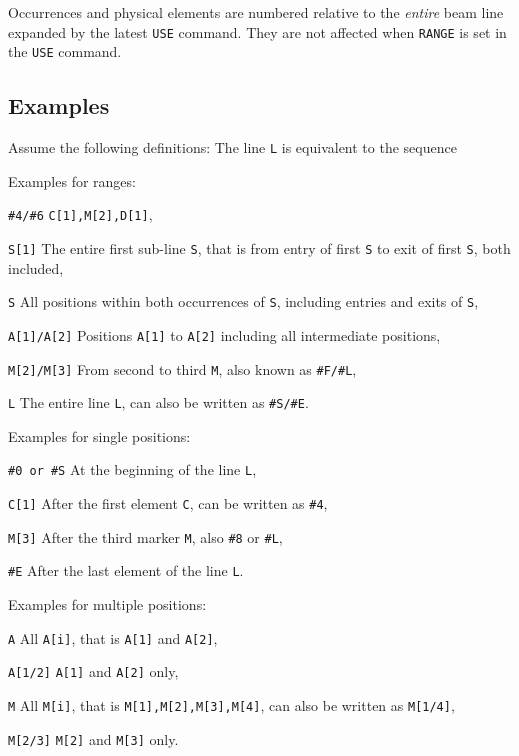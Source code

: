 Occurrences and physical elements are numbered relative to the {\em entire}
beam line expanded by the latest {\tt USE} command.
They are not affected when {\tt RANGE} is set in the {\tt USE} command.
 
\subsection{Examples}
Assume the following definitions:
The line {\tt L} is equivalent to the sequence
 
Examples for ranges:
\begin{mylist}
\item[{\tt \#4/\#6}]
{\tt C[1],M[2],D[1]},
\item[{\tt S[1]}]
The entire first sub-line {\tt S},
that is from entry of first {\tt S} to exit of first {\tt S},
both included,
\item[{\tt S}]
All positions within both occurrences of {\tt S},
including entries and exits of {\tt S},
\item[{\tt A[1]/A[2]}]
Positions {\tt A[1]} to {\tt A[2]} including all intermediate positions,
\item[{\tt M[2]/M[3]}]
From second to third {\tt M}, also known as {\tt \#F/\#L},
\item[{\tt L}]
The entire line {\tt L},
can also be written as {\tt \#S/\#E}.
\end{mylist}
 
Examples for single positions:
\begin{mylist}
\item[{\tt \#0 or \#S}]
At the beginning of the line {\tt L},
\item[{\tt C[1]}]
After the first element {\tt C}, can be written as {\tt \#4},
\item[{\tt M[3]}]
After the third marker {\tt M}, also {\tt \#8} or {\tt \#L},
\item[{\tt \#E}]
After the last element of the line {\tt L}.
\end{mylist}
 
Examples for multiple positions:
\begin{mylist}
\item[{\tt A}]
All {\tt A[i]}, that is {\tt A[1]} and {\tt A[2]},
\item[{\tt A[1/2]}]
{\tt A[1]} and {\tt A[2]} only,
\item[{\tt M}]
All {\tt M[i]}, that is {\tt M[1],M[2],M[3],M[4]},
can also be written as {\tt M[1/4]},
\item[{\tt M[2/3]}]
{\tt M[2]} and {\tt M[3]} only.
\end{mylist}
 
